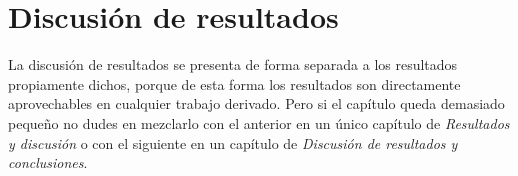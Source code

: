 \chapter{Discusión de resultados}
\label{ch:discusion-resultados}

La discusión de resultados se presenta de forma separada a los resultados propiamente dichos, porque de esta forma los resultados son directamente aprovechables en cualquier trabajo derivado.  Pero si el capítulo queda demasiado pequeño no dudes en mezclarlo con el anterior en un único capítulo de \emph{Resultados y discusión} o con el siguiente en un capítulo de \emph{Discusión de resultados y conclusiones}.